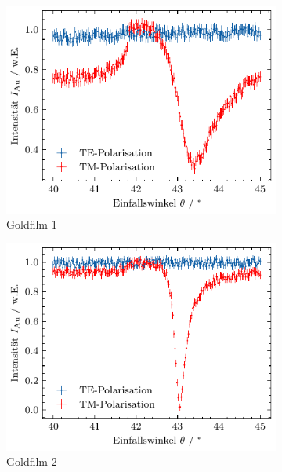 \begin{figure}[H]
    \centering
    \begin{subfigure}{0.4\textwidth}
        \centering
        \includegraphics[width=\linewidth]{../figs/au1}
        \caption{Goldfilm 1}
    \end{subfigure}
    \begin{subfigure}{0.4\textwidth}
        \centering
        \includegraphics[width=\linewidth]{../figs/au2}
        \caption{Goldfilm 2}
    \end{subfigure}
    \begin{subfigure}{0.4\textwidth}
        \centering

\end{subfigure}
\end{figure}

